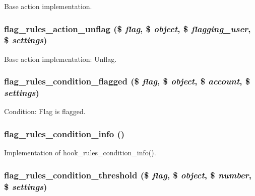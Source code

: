 Base action implementation. \hypertarget{flag_8rules_8inc_4b6594e3196980112aa2c66bf9c01aee}{
\subsubsection[{flag\_\-rules\_\-action\_\-unflag}]{\setlength{\rightskip}{0pt plus 5cm}flag\_\-rules\_\-action\_\-unflag (\$ {\em flag}, \/  \$ {\em object}, \/  \$ {\em flagging\_\-user}, \/  \$ {\em settings})}}
\label{flag_8rules_8inc_4b6594e3196980112aa2c66bf9c01aee}


Base action implementation: Unflag. \hypertarget{flag_8rules_8inc_e7df524a480d9efa4d45cbbb5c553b77}{
\subsubsection[{flag\_\-rules\_\-condition\_\-flagged}]{\setlength{\rightskip}{0pt plus 5cm}flag\_\-rules\_\-condition\_\-flagged (\$ {\em flag}, \/  \$ {\em object}, \/  \$ {\em account}, \/  \$ {\em settings})}}
\label{flag_8rules_8inc_e7df524a480d9efa4d45cbbb5c553b77}


Condition: Flag is flagged. \hypertarget{flag_8rules_8inc_ff1b49547204500da520d93710e5b8a5}{
\subsubsection[{flag\_\-rules\_\-condition\_\-info}]{\setlength{\rightskip}{0pt plus 5cm}flag\_\-rules\_\-condition\_\-info ()}}
\label{flag_8rules_8inc_ff1b49547204500da520d93710e5b8a5}


Implementation of hook\_\-rules\_\-condition\_\-info(). \hypertarget{flag_8rules_8inc_2c2dcf4a344e8af58b1fa3d1c101c3db}{
\subsubsection[{flag\_\-rules\_\-condition\_\-threshold}]{\setlength{\rightskip}{0pt plus 5cm}flag\_\-rules\_\-condition\_\-threshold (\$ {\em flag}, \/  \$ {\em object}, \/  \$ {\em number}, \/  \$ {\em settings})}}
\label{flag_8rules_8inc_2c2dcf4a344e8af58b1fa3d1c101c3db}


